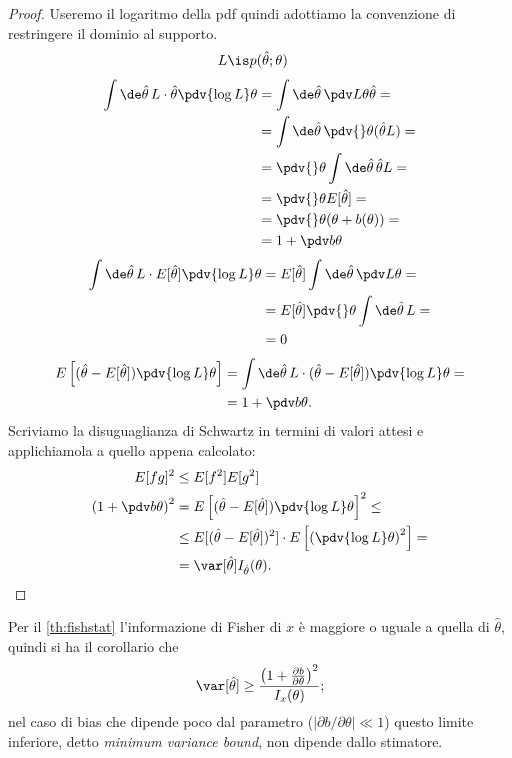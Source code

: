 \begin{proof}
	Useremo il logaritmo della pdf quindi adottiamo la convenzione di restringere il dominio al supporto.
	\begin{align*}
		L &\is p(\hat\theta;\theta)
	\end{align*}
	\begin{align*}
		\int \de\hat\theta\,
		L \cdot \hat\theta \pdv{\log L}\theta 
		&= \int \de\hat\theta\,
		\pdv L\theta \hat\theta = \\
		&= \int \de\hat\theta\,
		\pdv{}\theta (\hat\theta L) = \\
		&= \pdv{}\theta \int \de\hat\theta\, \hat\theta L = \\
		&= \pdv{}\theta E[\hat\theta] = \\
		&= \pdv{}\theta (\theta + b(\theta)) = \\
		&= 1 + \pdv b\theta
	\end{align*}
	\begin{align*}
		\int \de\hat\theta\,
		L \cdot E[\hat\theta] \pdv{\log L}\theta
		&= E[\hat\theta] \int \de\hat\theta\, \pdv L\theta = \\
		&= E[\hat\theta] \pdv{}\theta \int \de\hat\theta\, L = \\
		&= 0
	\end{align*}
	\begin{align*}
		E \left[ (\hat\theta - E[\hat\theta]) \pdv{\log L}\theta \right]
		&= \int \de\hat\theta\, L \cdot
		(\hat\theta - E[\hat\theta]) \pdv{\log L}\theta = \\
		&= 1 + \pdv b\theta.
	\end{align*}
	Scriviamo la disuguaglianza di Schwartz in termini di valori attesi
	e applichiamola a quello appena calcolato:
	\begin{align*}
		E[fg]^2 &\le E[f^2]E[g^2] \\
		\left( 1 + \pdv b\theta \right)^2
		&= E \left[ (\hat\theta - E[\hat\theta]) \pdv{\log L}\theta \right]^2 \le \\
		&\le E[(\hat\theta - E[\hat\theta])^2]
		\cdot E \left[ \left( \pdv{\log L}\theta \right)^2 \right] = \\
		&= \var[\hat\theta] I_{\hat\theta}(\theta). \qedhere
	\end{align*}
\end{proof}

Per il \autoref{th:fishstat} l'informazione di Fisher di $x$ è maggiore o uguale a quella di $\hat\theta$,
quindi si ha il corollario che
\begin{equation*}
	\var[\hat\theta] \ge \frac{\left( 1 + \frac{\partial b}{\partial\theta} \right)^2}{I_x(\theta)};
\end{equation*}
nel caso di bias che dipende poco dal parametro ($|\partial b/\partial\theta| \ll 1$)
questo limite inferiore, detto \emph{minimum variance bound}, non dipende dallo stimatore.


